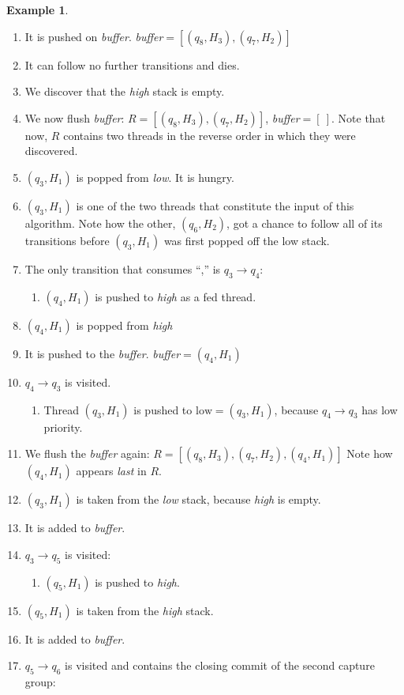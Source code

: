 \documentclass[english]{sigplanconf}
\theoremstyle{definition}
\newtheorem{example}{Example}[section]
\begin{document}
\begin{example}
\begin{enumerate}
\item It is pushed on \emph{buffer}. \emph{buffer}$=[(q_8, H_3), (q_7, H_2)]$
\item It can follow no further transitions and dies.
\item We discover that the \emph{high} stack is empty.
\item We now flush \emph{buffer}: $R=[(q_8, H_3), (q_7, H_2)]$, \emph{buffer}$=[\ ]$.
	Note that now, $R$ contains two threads in the reverse order in which they were discovered.
\item $(q_3, H_1)$ is popped from \emph{low}. It is hungry.
\item  $(q_3, H_1)$ is one of the two threads that constitute the
	input of this algorithm. Note how the other, $(q_6, H_2)$, got a
	chance to follow all of its transitions before $(q_3, H_1)$ was
	first popped off the low stack.
\item The only transition that consumes ``,'' is $q_3\rightarrow q_4$:\begin{enumerate}
	\item $(q_4, H_1)$ is pushed to \emph{high} as a fed thread.
\end{enumerate}
\item $(q_4, H_1)$ is popped from \emph{high}
\item It is pushed to the \emph{buffer}. \emph{buffer}$=(q_4, H_1)$
\item $q_4\rightarrow q_3$ is visited.
\begin{enumerate}
	\item Thread $(q_3, H_1)$ is pushed to 
	$ \mbox{low} = (q_3, H_1)$, 
	because $q_4\rightarrow q_3$ has low priority.
\end{enumerate}
\item We flush the \emph{buffer} again: $R=[(q_8, H_3), (q_7, H_2), (q_4, H_1)]$
	Note how $(q_4, H_1)$ appears \emph{last} in $R$.
\item $(q_3, H_1)$ is taken from the \emph{low} stack, because \emph{high} is empty.
\item It is added to \emph{buffer}.
\item $q_3\rightarrow q_5$ is visited:\begin{enumerate}
	\item $(q_5, H_1)$ is pushed to \emph{high}.
\end{enumerate}
\item $(q_5, H_1)$ is taken from the \emph{high} stack.
\item It is added to \emph{buffer}.
\item $q_5\rightarrow q_6$ is visited and contains the closing commit of the second capture group:\begin{enumerate}

\end{enumerate}
\end{enumerate}
\end{example}
\end{document}
